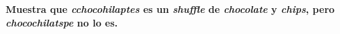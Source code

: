 \textbf{Muestra que \textit{cchocohilaptes} es un \textit{shuffle} de \textit{chocolate} y \textit{chips}, pero \textit{chocochilatspe} no lo es.}\vspace{.2cm}

\textcolor{bibi}{}
\begin{quote}
\end{quote}